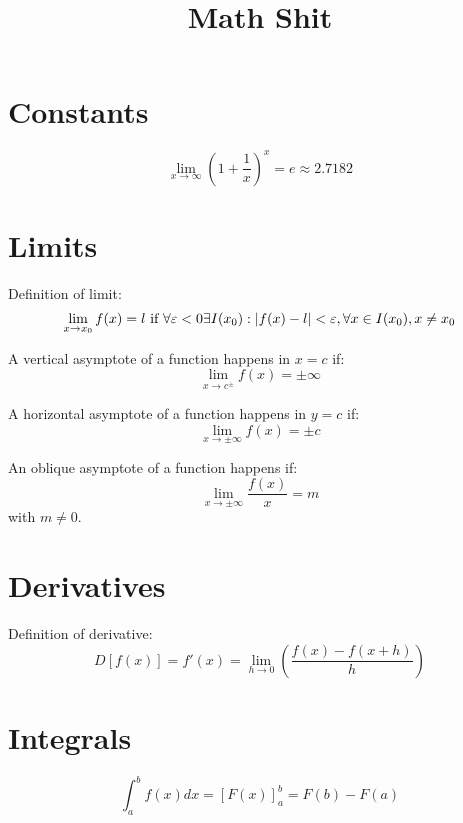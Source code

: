 \documentclass{article}
\begin{document}
\title{Math Shit}
\boldmath

\section{Constants}

\begin{equation}
\lim_{x\to\infty}(1+\frac{1}{x})^x=e\approx2.7182
\end{equation}

\section{Limits}

Definition of limit:
\begin{equation}
\lim_{x\to{x_0}}f(x) = l \textnormal{ if } \forall\varepsilon<0\exists I(x_0): |f(x) - l| < \varepsilon, \forall x \in I(x_0), x\neq x_0
\end{equation}

A vertical asymptote of a function happens in $x = c$ if:
\begin{equation}
\lim_{x\to{c^\pm}} f(x) = \pm\infty
\end{equation}

A horizontal asymptote of a function happens in $y = c$ if:
\begin{equation}
\lim_{x\to{\pm\infty}} f(x) = \pm c
\end{equation}

An oblique asymptote of a function happens if:
\begin{equation}
\lim_{x\to{\pm\infty}} \frac{f(x)}{x} = m
\end{equation}
with $m \neq 0$.

\section{Derivatives}

Definition of derivative:
\begin{equation}
D[f(x)] = f'(x) = \lim_{h\to0}(\frac{f(x)-f(x+h)}{h})
\end{equation}

\section{Integrals}

\begin{equation}
\int_{a}^{b} f(x) dx = [F(x)]_{a}^{b} = F(b) - F(a)
\end{equation}
\end{document}
